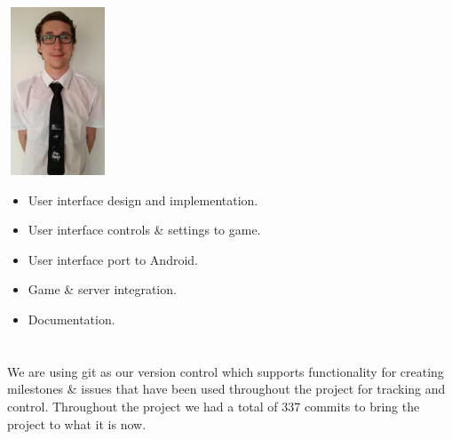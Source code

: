 \documentclass[letterpaper]{article}
\begin{document}
		\begin{minipage}[l]{0.23\textwidth}
			\begin{flushleft}
				\includegraphics[width=30mm,height=50mm]{Members/Gerhard.jpg}
			\end{flushleft}
		\end{minipage}
		\begin{minipage}[r]{0.75\textwidth}
				\begin{itemize}
					\item User interface design and implementation.
					\item User interface controls \& settings to game.
					\item User interface port to Android.
					\item Game \& server integration.
					\item Documentation.
				\end{itemize}
		\end{minipage}
		
		\vspace{0.2in}
	\section*{\colorbox{black}{}} 
		\vspace{0.1in}
		
		We are using git as our version control which supports functionality for creating milestones \& issues that have been used throughout the project for tracking and control. Throughout the project we had a total of 337 commits to bring the project to what it is now.
			
\end{document}
